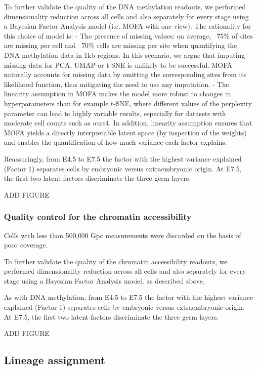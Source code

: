 To further validate the quality of the DNA methylation readouts, we performed dimensionality reduction across all cells and also separately for every stage using a Bayesian Factor Analysis model (i.e. MOFA with one view). The rationality for this choice of model is:
- The presence of missing values: on average, ~75\% of sites are missing per cell and ~70\% cells are missing per site when quantifying the DNA methylation data in 1kb regions. In this scenario, we argue that imputing missing data for PCA, UMAP or t-SNE is unlikely to be successful. MOFA naturally accounts for missing data by omitting the corresponding sites from its likelihood function, thus mitigating the need to use any imputation.
- The linearity assumption in MOFA makes the model more robust to changes in hyperparameters than for example t-SNE, where different values of the perplexity parameter can lead to highly variable results, especially for datasets with moderate cell counts such as ours4. In addition, linearity assumption ensures that MOFA yields a directly interpretable latent space (by inspection of the weights) and enables the quantification of how much variance each factor explains.

Reassuringly, from E4.5 to E7.5 the factor with the highest variance explained (Factor 1) separates cells by embryonic versus extraembryonic origin. At E7.5, the first two latent factors discriminate the three germ layers.

	ADD FIGURE

\subsubsection{Quality control for the chromatin accessibility}

Cells with less than 500,000 Gpc measurements were discarded on the basis of poor coverage.

To further validate the quality of the chromatin accessibility readouts, we performed dimensionality reduction across all cells and also separately for every stage using a Bayesian Factor Analysis model, as described above.

As with DNA methylation, from E4.5 to E7.5 the factor with the highest variance explained (Factor 1) separates cells by embryonic versus extraembryonic origin. At E7.5, the first two latent factors discriminate the three germ layers.

	ADD FIGURE

\subsection{Lineage assignment}

